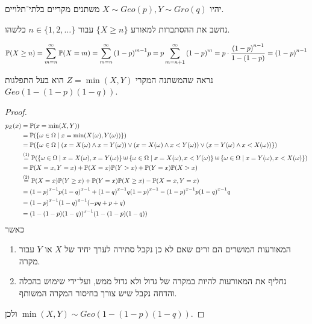 \question{}
יהיו $X \sim Geo(p), Y \sim Gro(q)$ משתנים מקריים בלתי־תלויים.

\subquestion{}
נחשב את ההסתברות למאורע $\{X \ge n \}$ עבור $n \in \{1, 2, \dots\}$ כלשהו.
\begin{solution}
	\[
		\mathbb{P}(X \ge n)
		= \sum_{m = n}^\infty \mathbb{P}(X = m)
		= \sum_{m = n}^\infty {(1 - p)}^{m - 1} p
		= p \sum_{m = n + 1}^\infty {(1 - p)}^m
		= p \cdot \frac{{(1 - p)}^{n - 1}}{1 - (1 - p)}
		= {(1 - p)}^{n - 1}
	\]
\end{solution}

\subquestion{}
נראה שהמשתנה המקרי $Z = \min(X, Y)$ הוא בעל התפלגות $Geo(1 - (1 - p)(1 - q))$.
\begin{proof}
	\begin{align*}
		p_Z(x)
		& = \mathbb{P}(x = \min(X, Y)) \\
		& = \mathbb{P}(\{\omega \in \Omega \mid x = \min(X(\omega), Y(\omega))\}) \\
		& = \mathbb{P}(\{\omega \in \Omega \mid (x = X(\omega) \land x = Y(\omega)) \lor (x = X(\omega) \land x < Y(\omega)) \lor (x = Y(\omega) \land x < X(\omega))\}) \\
		& \overset{(1)}{=} \mathbb{P}(\{\omega \in \Omega \mid x = X(\omega), x = Y(\omega)\} \uplus \{ \omega \in \Omega \mid x = X(\omega), x < Y(\omega)\} \uplus \{\omega \in \Omega \mid x = Y(\omega), x < X(\omega)\}) \\
		& = \mathbb{P}(X = x, Y = x) + \mathbb{P}(X = x) \mathbb{P}(Y > x) + \mathbb{P}(Y = x) \mathbb{P}(X > x) \\
		& \overset{(2)}{=} \mathbb{P}(X = x) \mathbb{P}(Y \ge x) + \mathbb{P}(Y = x) \mathbb{P}(X \ge x) - \mathbb{P}(X = x, Y = x) \\
		& = {(1 - p)}^{x - 1} p {(1 - q)}^{x - 1} + {(1 - q)}^{x - 1} q {(1 - p)}^{x - 1} - {(1 - p)}^{x - 1} p {(1 - q)}^{x - 1} q \\
		& = {(1 - p)}^{x - 1} {(1 - q)}^{x - 1} (-p q + p + q) \\
		& = {(1 - (1 - p)(1 - q))}^{x - 1} (1 - (1 - p)(1 - q)) \\
	\end{align*}
	כאשר
	\begin{enumerate}
		\item המאורעות המושרים הם זרים שאם לא כן נקבל סתירה לערך יחיד של $X$ או $Y$ עבור מקרה.
		\item נחליף את המאורעות להיות במקרה של גדול ולא גדול ממש, ועל־ידי שימוש בהכלה והדחה נקבל שיש צורך בחיסור המקרה המשותף.
	\end{enumerate}
	ולכן $\min(X, Y) \sim Geo(1 - (1 - p)(1 - q))$.
\end{proof}

